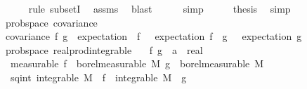 \begin{isabellebody}
\ \ \ \ \ \isamarkupfalse%
\ {\isacharparenleft}{\kern0pt}rule\ subsetI{\isacharparenright}{\kern0pt}\ \isamarkupfalse%
\ assms\ \isamarkupfalse%
\ blast\isanewline
\ \ \ \ \isamarkupfalse%
\ simp\isanewline
\ \ \isamarkupfalse%
\ \isamarkupfalse%
\ {\isacharquery}{\kern0pt}thesis\ \isamarkupfalse%
\ simp\isanewline
{}\isamarkupfalse%
%
\endisatagproof
{\isafoldproof}%
%
\isadelimproof
\isanewline
%
\endisadelimproof
\isanewline
{}\isamarkupfalse%
\ {\isacharparenleft}{\kern0pt}\ prob{\isacharunderscore}{\kern0pt}space{\isacharparenright}{\kern0pt}\ covariance\ \ \isanewline
\ \ {\isachardoublequoteopen}covariance\ f\ g\ {\isacharequal}{\kern0pt}\ expectation\ {\isacharparenleft}{\kern0pt}{\isasymlambda}{\isasymomega}{\isachardot}{\kern0pt}\ {\isacharparenleft}{\kern0pt}f\ {\isasymomega}\ {\isacharminus}{\kern0pt}\ expectation\ f{\isacharparenright}{\kern0pt}\ {\isacharasterisk}{\kern0pt}\ {\isacharparenleft}{\kern0pt}g\ {\isasymomega}\ {\isacharminus}{\kern0pt}\ expectation\ g{\isacharparenright}{\kern0pt}{\isacharparenright}{\kern0pt}{\isachardoublequoteclose}\isanewline
\isanewline
{}\isamarkupfalse%
\ {\isacharparenleft}{\kern0pt}\ prob{\isacharunderscore}{\kern0pt}space{\isacharparenright}{\kern0pt}\ real{\isacharunderscore}{\kern0pt}prod{\isacharunderscore}{\kern0pt}integrable{\isacharcolon}{\kern0pt}\isanewline
\ \ \ f\ g\ {\isacharcolon}{\kern0pt}{\isacharcolon}{\kern0pt}\ {\isachardoublequoteopen}{\isacharprime}{\kern0pt}a\ {\isasymRightarrow}\ real{\isachardoublequoteclose}\isanewline
\ \ \ {\isacharbrackleft}{\kern0pt}measurable{\isacharbrackright}{\kern0pt}{\isacharcolon}{\kern0pt}\ {\isachardoublequoteopen}f\ {\isasymin}\ borel{\isacharunderscore}{\kern0pt}measurable\ M{\isachardoublequoteclose}\ {\isachardoublequoteopen}g\ {\isasymin}\ borel{\isacharunderscore}{\kern0pt}measurable\ M{\isachardoublequoteclose}\isanewline
\ \ \ sq{\isacharunderscore}{\kern0pt}int{\isacharcolon}{\kern0pt}\ {\isachardoublequoteopen}integrable\ M\ {\isacharparenleft}{\kern0pt}{\isasymlambda}{\isasymomega}{\isachardot}{\kern0pt}\ f\ {\isasymomega}{\isacharcircum}{\kern0pt}{}{\isacharparenright}{\kern0pt}{\isachardoublequoteclose}\ {\isachardoublequoteopen}integrable\ M\ {\isacharparenleft}{\kern0pt}{\isasymlambda}{\isasymomega}{\isachardot}{\kern0pt}\ g\ {\isasymomega}{\isacharcircum}{\kern0pt}{}{\isacharparenright}{\kern0pt}{\isachardoublequoteclose}\isanewline

\end{isabellebody}
